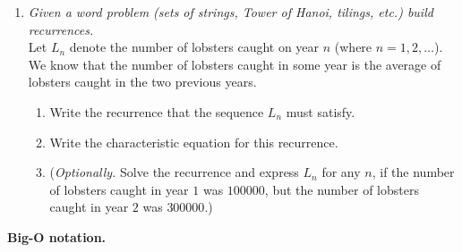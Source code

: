 \documentclass[a4paper,12pt]{article}
\begin{document}
\begin{enumerate}
\item {\small \em Given a word problem (sets of strings, Tower of Hanoi, tilings, etc.) build recurrences.}\\
Let $L_{n}$ denote the number of lobsters caught on year $n$ (where $n = 1,2,\ldots$).
We know that the number of lobsters caught in some year is the average of lobsters caught in the
two previous years.
\begin{enumerate}
\item Write the recurrence that the sequence $L_n$ must satisfy.
\item Write the characteristic equation for this recurrence.
\item ({\em Optionally.} Solve the recurrence and express $L_n$ for any $n$, if the number of lobsters caught in year
$1$ was $100000$, but the number of lobsters caught in year $2$ was $300000$.)
\end{enumerate}

\end{enumerate}


\vspace{10pt}
{\bf Big-O notation.}
\end{document}
